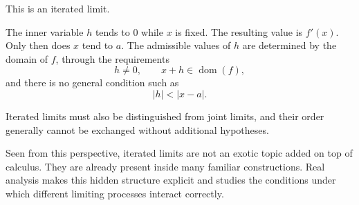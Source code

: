 \documentclass{essay}
\begin{document}
This is an iterated limit.

The inner variable \(h\) tends to \(0\) while \(x\) is fixed. The resulting value is \(f'(x)\). Only then does \(x\) tend to \(a\). The admissible values of \(h\) are determined by the domain of \(f\), through the requirements
\[
h\neq0,
\qquad
x+h\in\operatorname{dom}(f),
\]
and there is no general condition such as
\[
|h|<|x-a|.
\]

Iterated limits must also be distinguished from joint limits, and their order generally cannot be exchanged without additional hypotheses.

Seen from this perspective, iterated limits are not an exotic topic added on top of calculus. They are already present inside many familiar constructions. Real analysis makes this hidden structure explicit and studies the conditions under which different limiting processes interact correctly.
\end{document}
